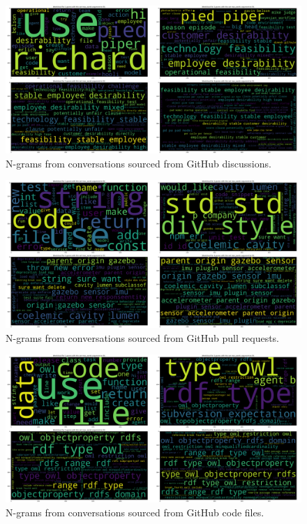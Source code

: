 \begin{figure}[H]
    \centering
    \includegraphics[width=\textwidth]{imgs/discussions-ngrams.png}
    \caption{N-grams from conversations sourced from GitHub discussions.}
    \label{fig:discussions-ngrams}
\end{figure}

\begin{figure}[H]
    \centering
    \includegraphics[width=\textwidth]{imgs/pull_requests-ngrams.png}
    \caption{N-grams from conversations sourced from GitHub pull requests.}
    \label{fig:pr-ngrams}
\end{figure}

\begin{figure}[H]
    \centering
    \includegraphics[width=\textwidth]{imgs/code_files-ngrams.png}
    \caption{N-grams from conversations sourced from GitHub code files.}
    \label{fig:code-ngrams}
\end{figure}

